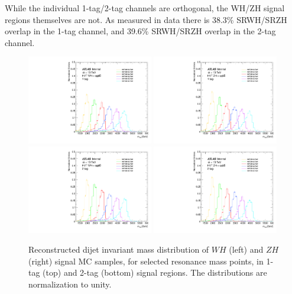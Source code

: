 While the individual 1-tag/2-tag channels are orthogonal, the WH/ZH signal regions themselves are not.
As measured in data there is 38.3\% SRWH/SRZH overlap in the 1-tag channel, and 39.6\% SRWH/SRZH overlap in the 2-tag channel.

\begin{figure}[htbp!]
\begin{center}
    \includegraphics[width=0.49\textwidth]{VHqqbb_WH_1tag_SignalPeaks.pdf}
    \includegraphics[width=0.49\textwidth]{VHqqbb_ZH_1tag_SignalPeaks.pdf} \\
    \includegraphics[width=0.49\textwidth]{VHqqbb_WH_2tag_SignalPeaks.pdf}
    \includegraphics[width=0.49\textwidth]{VHqqbb_ZH_2tag_SignalPeaks.pdf}
\end{center}
\caption{Reconstructed dijet invariant mass distribution of $WH$ (left) and $ZH$ (right) signal MC samples, for selected resonance mass points, in 1-tag (top) and 2-tag (bottom) signal regions. The distributions are normalization to unity.}
\label{fig:signalMjj}
\end{figure}

